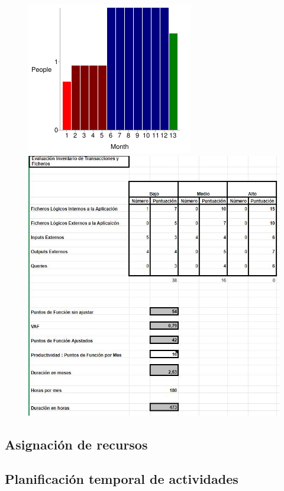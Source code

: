 \begin{figure}[htbp]
	\includegraphics{Grafica.png}
	\includegraphics[scale=0.5]{Estimacion de PF.JPG}
\end{figure}

\subsection{Asignación de recursos}

\subsection{Planificación temporal de actividades}